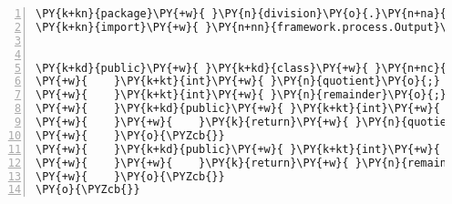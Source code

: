 \begin{Verbatim}[commandchars=\\\{\},numbers=left,firstnumber=1,stepnumber=1,frame=single,fontsize=\small]
\PY{k+kn}{package}\PY{+w}{ }\PY{n}{division}\PY{o}{.}\PY{n+na}{process}\PY{o}{;}
\PY{k+kn}{import}\PY{+w}{ }\PY{n+nn}{framework.process.Output}\PY{o}{;}


\PY{k+kd}{public}\PY{+w}{ }\PY{k+kd}{class}\PY{+w}{ }\PY{n+nc}{QuotientAndRemainder}\PY{+w}{ }\PY{k+kd}{implements}\PY{+w}{ }\PY{n}{Output}\PY{+w}{ }\PY{o}{\PYZob{}}
\PY{+w}{    }\PY{k+kt}{int}\PY{+w}{ }\PY{n}{quotient}\PY{o}{;}
\PY{+w}{    }\PY{k+kt}{int}\PY{+w}{ }\PY{n}{remainder}\PY{o}{;}
\PY{+w}{    }\PY{k+kd}{public}\PY{+w}{ }\PY{k+kt}{int}\PY{+w}{ }\PY{n+nf}{getQuotient}\PY{o}{(}\PY{o}{)}\PY{+w}{ }\PY{o}{\PYZob{}}
\PY{+w}{    }\PY{+w}{    }\PY{k}{return}\PY{+w}{ }\PY{n}{quotient}\PY{o}{;}
\PY{+w}{    }\PY{o}{\PYZcb{}}
\PY{+w}{    }\PY{k+kd}{public}\PY{+w}{ }\PY{k+kt}{int}\PY{+w}{ }\PY{n+nf}{getRemainder}\PY{o}{(}\PY{o}{)}\PY{+w}{ }\PY{o}{\PYZob{}}
\PY{+w}{    }\PY{+w}{    }\PY{k}{return}\PY{+w}{ }\PY{n}{remainder}\PY{o}{;}
\PY{+w}{    }\PY{o}{\PYZcb{}}
\PY{o}{\PYZcb{}}
\end{Verbatim}
